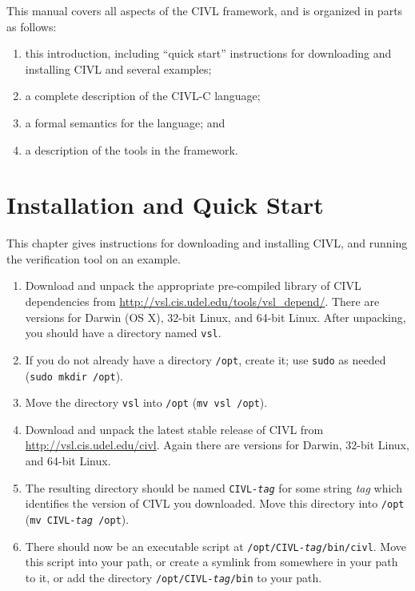 This manual covers all aspects of the CIVL framework, and is organized in parts
as follows:
\begin{enumerate}
\item this introduction, including ``quick start'' instructions for
  downloading and installing CIVL and several examples;
\item a complete description of the CIVL-C language;
\item a formal semantics for the language; and
\item a description of the tools in the framework.
\end{enumerate}

\chapter{Installation and Quick Start}

This chapter gives instructions for downloading and installing CIVL,
and running the verification tool on an example.

\begin{enumerate}

\item Download and unpack the appropriate pre-compiled library of CIVL
  dependencies from
  \hbox{\url{http://vsl.cis.udel.edu/tools/vsl_depend/}}.  There are
  versions for Darwin (OS X), 32-bit Linux, and 64-bit Linux.
  After unpacking, you should have a directory named \texttt{vsl}.
\item If you do not already have a directory \texttt{/opt},
  create it; use \texttt{sudo} as needed (\verb!sudo mkdir /opt!).
\item Move the directory \texttt{vsl} into \texttt{/opt}
  (\verb!mv vsl /opt!).
\item Download and unpack the latest stable release of CIVL from 
  \url{http://vsl.cis.udel.edu/civl}.  Again there are versions
  for Darwin, 32-bit Linux, and 64-bit Linux.
\item The resulting directory should be named
  \texttt{CIVL-\textit{tag}} for some string \textit{tag} which
  identifies the version of CIVL you downloaded.  Move this directory
  into \texttt{/opt} (\texttt{mv\ CIVL-\textit{tag}\ /opt}).
\item There should now be an executable script at
  \texttt{/opt/CIVL-\textit{tag}/bin/civl}.  Move this script into
  your path, or create a symlink from somewhere in your path to it, or
  add the directory \texttt{/opt/CIVL-\textit{tag}/bin} to your path.
\end{enumerate}


